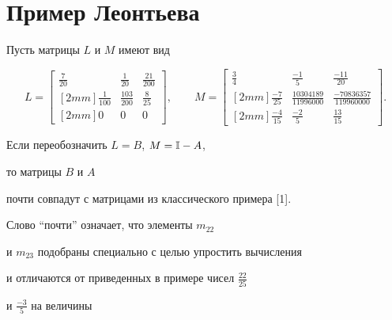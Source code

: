 \section{Пример Леонтьева}





Пусть матрицы $L$ и $M$ имеют вид


$$


L =


\begin{bmatrix}


\frac {7}{20} & \frac {1}{20}


 & \frac {21}{200} \\ [2mm]


\frac {1}{100} & \frac {103}{200}


 & \frac {8}{25} \\ [2mm]


0 & 0 & 0


\end{bmatrix}


,\qquad


M =


\begin{bmatrix}


\frac {3}{4} & \frac {-1}{5} &


\frac {-11}{20} \\ [2mm]


\frac {-7}{25} & \frac {10304189


}{11996000} & \frac {-70836357}{119960000} \\ [2mm]


\frac {-4}{15} & \frac {-2}{5}


 & \frac {13}{15}


\end{bmatrix}


.


$$


Если переобозначить $L = B$, $M = {\Bbb I} - A$,


то матрицы $B$ и $A$


почти совпадут с матрицами из классического примера [1].


Слово ``почти'' означает, что элементы $m_{22}$


и $m_{23}$ подобраны специально с целью упростить вычисления


и отличаются от приведенных в примере чисел $\frac{22}{25}$


и $\frac{-3}{5}$ на величины



